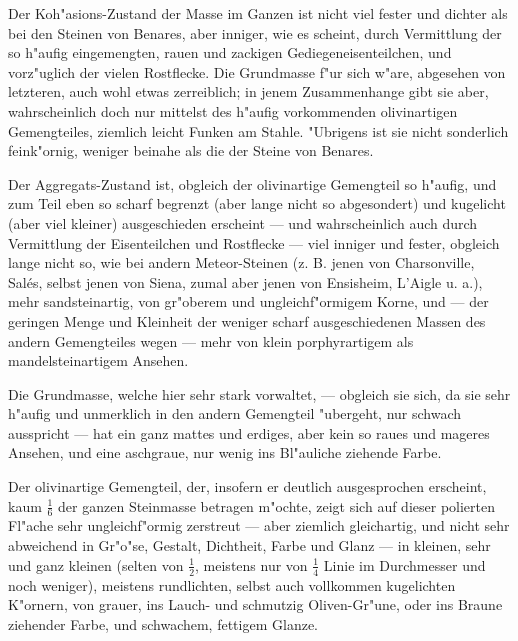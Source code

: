 \documentclass[a4paper, 11pt, oneside, german]{article}
\begin{document}
Der Koh"asions-Zustand der Masse im Ganzen ist nicht viel fester und dichter als bei den Steinen von Benares, aber inniger, wie es scheint, durch Vermittlung der so h"aufig eingemengten, rauen und zackigen Gediegeneisenteilchen, und vorz"uglich der vielen Rostflecke. Die Grundmasse f"ur sich w"are, abgesehen von letzteren, auch wohl etwas zerreiblich; in jenem Zusammenhange gibt sie aber, wahrscheinlich doch nur mittelst des h"aufig vorkommenden olivinartigen Gemengteiles, ziemlich leicht Funken am Stahle. "Ubrigens ist sie nicht sonderlich feink"ornig, weniger beinahe als die der Steine von Benares.

Der Aggregats-Zustand ist, obgleich der olivinartige Gemengteil so h"aufig, und zum Teil eben so scharf begrenzt (aber lange nicht so abgesondert) und kugelicht (aber viel kleiner) ausgeschieden erscheint --- und wahrscheinlich auch durch Vermittlung der Eisenteilchen und Rostflecke --- viel inniger und fester, obgleich lange nicht so, wie bei andern Meteor-Steinen (z. B. jenen von Charsonville, Salés, selbst jenen von Siena, zumal aber jenen von Ensisheim, L'Aigle u. a.), mehr sandsteinartig, von gr"oberem und ungleichf"ormigem Korne, und --- der geringen Menge und Kleinheit der weniger scharf ausgeschiedenen Massen des andern Gemengteiles wegen --- mehr von klein porphyrartigem als mandelsteinartigem Ansehen.

Die Grundmasse, welche hier sehr stark vorwaltet, --- obgleich sie sich, da sie sehr h"aufig und unmerklich in den andern Gemengteil "ubergeht, nur schwach ausspricht --- hat ein ganz mattes und erdiges, aber kein so raues und mageres Ansehen, und eine aschgraue, nur wenig ins Bl"auliche ziehende Farbe.

Der olivinartige Gemengteil, der, insofern er deutlich ausgesprochen erscheint, kaum $\frac{1}{6}$ der ganzen Steinmasse betragen m"ochte, zeigt sich auf dieser polierten Fl"ache sehr ungleichf"ormig zerstreut --- aber ziemlich gleichartig, und nicht sehr abweichend in Gr"o"se, Gestalt, Dichtheit, Farbe und Glanz --- in kleinen, sehr und ganz kleinen (selten von $\frac{1}{2}$, meistens nur von $\frac{1}{4}$ Linie im Durchmesser und noch weniger), meistens rundlichten, selbst auch vollkommen kugelichten K"ornern, von grauer, ins Lauch- und schmutzig Oliven-Gr"une, oder ins Braune ziehender Farbe, und schwachem, fettigem Glanze.
\end{document}
